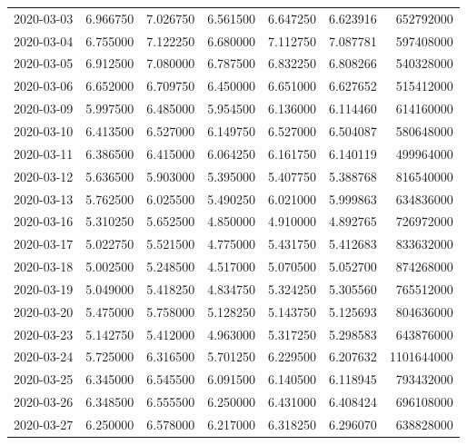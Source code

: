 \begin{tabular}{lrrrrrr}
2020-03-03 &    6.966750 &    7.026750 &    6.561500 &    6.647250 &    6.623916 &   652792000 \\
2020-03-04 &    6.755000 &    7.122250 &    6.680000 &    7.112750 &    7.087781 &   597408000 \\
2020-03-05 &    6.912500 &    7.080000 &    6.787500 &    6.832250 &    6.808266 &   540328000 \\
2020-03-06 &    6.652000 &    6.709750 &    6.450000 &    6.651000 &    6.627652 &   515412000 \\
2020-03-09 &    5.997500 &    6.485000 &    5.954500 &    6.136000 &    6.114460 &   614160000 \\
2020-03-10 &    6.413500 &    6.527000 &    6.149750 &    6.527000 &    6.504087 &   580648000 \\
2020-03-11 &    6.386500 &    6.415000 &    6.064250 &    6.161750 &    6.140119 &   499964000 \\
2020-03-12 &    5.636500 &    5.903000 &    5.395000 &    5.407750 &    5.388768 &   816540000 \\
2020-03-13 &    5.762500 &    6.025500 &    5.490250 &    6.021000 &    5.999863 &   634836000 \\
2020-03-16 &    5.310250 &    5.652500 &    4.850000 &    4.910000 &    4.892765 &   726972000 \\
2020-03-17 &    5.022750 &    5.521500 &    4.775000 &    5.431750 &    5.412683 &   833632000 \\
2020-03-18 &    5.002500 &    5.248500 &    4.517000 &    5.070500 &    5.052700 &   874268000 \\
2020-03-19 &    5.049000 &    5.418250 &    4.834750 &    5.324250 &    5.305560 &   765512000 \\
2020-03-20 &    5.475000 &    5.758000 &    5.128250 &    5.143750 &    5.125693 &   804636000 \\
2020-03-23 &    5.142750 &    5.412000 &    4.963000 &    5.317250 &    5.298583 &   643876000 \\
2020-03-24 &    5.725000 &    6.316500 &    5.701250 &    6.229500 &    6.207632 &  1101644000 \\
2020-03-25 &    6.345000 &    6.545500 &    6.091500 &    6.140500 &    6.118945 &   793432000 \\
2020-03-26 &    6.348500 &    6.555500 &    6.250000 &    6.431000 &    6.408424 &   696108000 \\
2020-03-27 &    6.250000 &    6.578000 &    6.217000 &    6.318250 &    6.296070 &   638828000 \\

\end{tabular}
